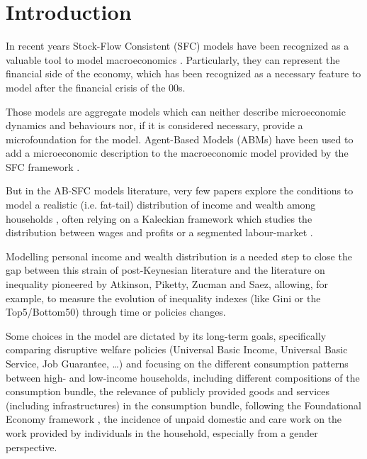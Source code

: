 \documentclass[a4paper, headings=standardclasses]{scrartcl}
\numberwithin{equation}{subsection}
\begin{document}
\section{Introduction}

In recent years Stock-Flow Consistent (SFC) models have been recognized as a valuable tool to model macroeconomics \parencite{nikiforos2017}. Particularly, they can represent the financial side of the economy, which has been recognized as a necessary feature to model after the financial crisis of the 00s.

Those models are aggregate models which can neither describe microeconomic dynamics and behaviours nor, if it is considered necessary, provide a microfoundation for the model.
Agent-Based Models (ABMs) have been used to add a microeconomic description to the macroeconomic model provided by the SFC framework \parencite{caverzasi2018,dosi2019}.

But in the AB-SFC models literature, very few papers explore the conditions to model a realistic (i.e. fat-tail) distribution of income and wealth among households \parencite[e.g.][]{dafermos2015,kinsella2011}, often relying on a Kaleckian framework which studies the distribution between wages and profits \parencite[e.g.][]{dosi2013a} or a segmented labour-market \parencite[e.g.][]{caiani2019a}.

Modelling personal income and wealth distribution is a needed step to close the gap between this strain of post-Keynesian literature and the literature on inequality pioneered by Atkinson, Piketty, Zucman and Saez, allowing, for example, to measure the evolution of inequality indexes (like Gini or the Top5/Bottom50) through time or policies changes.

Some choices in the model are dictated by its long-term goals, specifically comparing disruptive welfare policies (Universal Basic Income, Universal Basic Service, Job Guarantee, \dots) and focusing on the different consumption patterns between high- and low-income households, including different compositions of the consumption bundle, the relevance of publicly provided goods and services (including infrastructures) in the consumption bundle, following the Foundational Economy framework \parencite{arcidiacono2018}, the incidence of unpaid domestic and care work on the work provided by individuals in the household, especially from a gender perspective.
\end{document}
